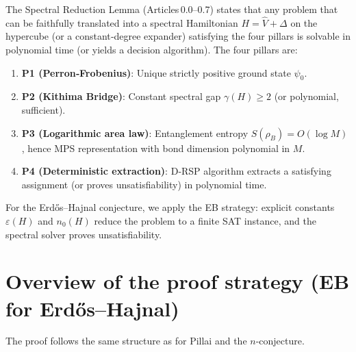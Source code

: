 \documentclass[11pt,a4paper]{article}
\begin{document}
The Spectral Reduction Lemma (Articles 0.0–0.7) states that any problem that can be faithfully translated into a spectral Hamiltonian $H = \hat{V} + \Delta$ on the hypercube (or a constant‑degree expander) satisfying the four pillars is solvable in polynomial time (or yields a decision algorithm). The four pillars are:

\begin{enumerate}
\item \textbf{P1 (Perron‑Frobenius)}: Unique strictly positive ground state $\psi_0$.
\item \textbf{P2 (Kithima Bridge)}: Constant spectral gap $\gamma(H) \ge 2$ (or polynomial, sufficient).
\item \textbf{P3 (Logarithmic area law)}: Entanglement entropy $S(\rho_B)=O(\log M)$, hence MPS representation with bond dimension polynomial in $M$.
\item \textbf{P4 (Deterministic extraction)}: D‑RSP algorithm extracts a satisfying assignment (or proves unsatisfiability) in polynomial time.
\end{enumerate}

For the Erdős–Hajnal conjecture, we apply the EB strategy: explicit constants $\varepsilon(H)$ and $n_0(H)$ reduce the problem to a finite SAT instance, and the spectral solver proves unsatisfiability.

\section{Overview of the proof strategy (EB for Erdős–Hajnal)}

The proof follows the same structure as for Pillai and the $n$-conjecture.
\end{document}

